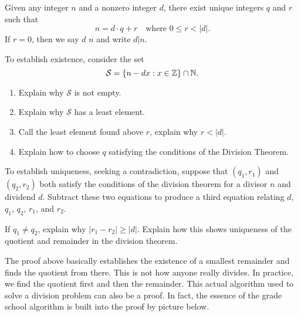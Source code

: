 \documentclass{ximera}
\begin{document}
\begin{theorem}\label{T:DT}
  Given any integer $n$ and a nonzero integer $d$, there exist unique
  integers $q$ and $r$ such that
  \[
  n = d\cdot q+r\quad\text{where $0\le r< |d|$.}
  \]
  If $r=0$, then we say $d$  $n$ and write $d|n$.
  \begin{sketch}
    To establish existence, consider the set
    \[
    \mathcal{S} = \{n -  dx : x\in \mathbb Z\}\cap \mathbb N.
    \]
    \begin{enumerate}
    \item Explain why $\mathcal S$ is not empty.
    \item Explain why $\mathcal S$ has a least element.
    \item Call the least element found above $r$, explain why $r < |d|$.
    \item Explain how to choose $q$ satisfying the conditions of the
      Division Theorem.
    \end{enumerate}
    
    To establish uniqueness, seeking a contradiction, suppose that
    $(q_1,r_1)$ and $(q_2,r_2)$ both satisfy the conditions of the
    division theorem for a divisor $n$ and dividend $d$. Subtract
    these two equations to produce a third equation relating $d$,
    $q_1$, $q_2$, $r_1$, and $r_2$.


    If $q_1 \ne q_2$, explain why $|r_1 - r_2| \ge |d|$.  Explain how
    this shows uniqueness of the quotient and remainder in the
    division theorem.
  \end{sketch}
\end{theorem}


The proof above basically establishes the existence of a smallest
remainder and finds the quotient from there. This is not how anyone
really divides. In practice, we find the quotient first and then the
remainder.  This actual algorithm used to solve a division problem can
also be a proof. In fact, the essence of the grade school algorithm is
built into the proof by picture below.
\end{document}
